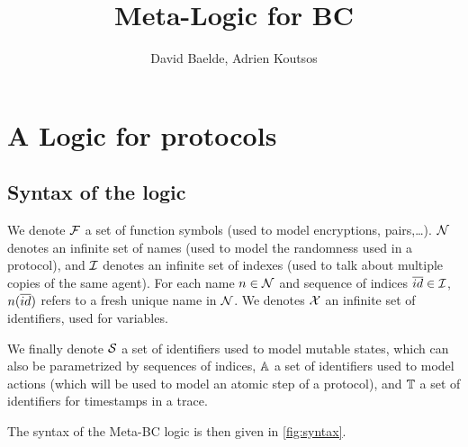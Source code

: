 \documentclass[a4paper]{article}
\theoremstyle{remark}
\begin{document}
\title{Meta-Logic for BC}


\author{David Baelde, Adrien Koutsos}

\maketitle

\section{A Logic for protocols}

\subsection{Syntax of the logic}
We denote $\mathcal{F}$ a set of function symbols (used to model encryptions,
pairs,\dots). $\mathcal{N}$ denotes an
infinite set of names (used to model the randomness used in a
protocol), and $\mathcal{I}$ denotes an infinite set of indexes (used to talk
about multiple copies of the same agent). For
each name $n\in \mathcal{N}$ and sequence of indices $\overline{id} \in \mathcal{I}$,
$n(\overline{id})$ refers to a fresh unique name in $\mathcal{N}$. We denotes $\mathcal{X}$ an
infinite set of identifiers, used for variables.

We finally denote $\mathcal{S}$ a set of identifiers used to model
mutable
states, which can also be parametrized by sequences of indices,
$\mathbb{A}$ a set of identifiers used to model actions
(which
will be used
to model an atomic step of a protocol), and $\mathbb{T}$ a set of
identifiers for timestamps in a trace.

The syntax of the Meta-BC logic is then given in \cref{fig:syntax}.
\end{document}
